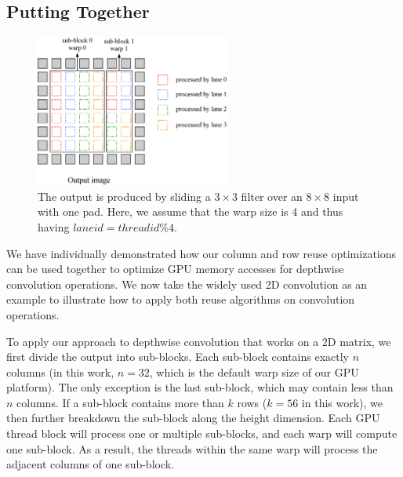 \subsection{Putting Together}
\label{sec:together}
\begin{figure}
	\centering
	\includegraphics[width=0.8\columnwidth,height=5cm]{./figure/overalldesign.eps} 
	\vspace{-3mm}
	\caption{The output is produced by sliding a $3 \times
3$ filter over an $8 \times 8$ input with one pad. Here, we assume
that the warp size is 4 and thus having $laneid=threadid\%4$.} \label{fig:overalldesign}
\end{figure}


We have individually demonstrated how our column and row reuse optimizations can be used together to optimize GPU memory accesses for
depthwise convolution operations. We now take the widely used 2D convolution as an example to illustrate how to apply both reuse algorithms
on convolution operations.


To apply our approach to depthwise convolution that works on a 2D matrix, we first divide the output into sub-blocks. Each sub-block
contains exactly $n$ columns (in this work, $n = 32$, which is the default warp size of our GPU platform). The only exception is the last
sub-block, which may contain less than $n$ columns. If a sub-block contains more than $k$ rows ($k=56$ in this work), we then further
breakdown the sub-block along the height dimension. Each GPU thread block will process one or multiple sub-blocks, and each warp will
compute one sub-block. As a result, the threads within the same warp will process the adjacent columns of one sub-block.


